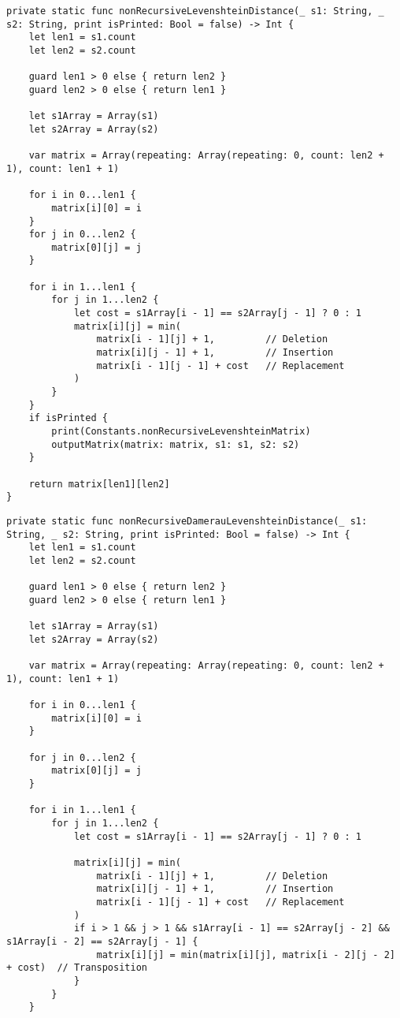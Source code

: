 \begin{lstlisting}[label=lst:nonRecursiveLevenshteinDistance,caption=Функция нахождения расстояния Левенштейна с использованием матрицы]
private static func nonRecursiveLevenshteinDistance(_ s1: String, _ s2: String, print isPrinted: Bool = false) -> Int {
	let len1 = s1.count
	let len2 = s2.count

	guard len1 > 0 else { return len2 }
	guard len2 > 0 else { return len1 }

	let s1Array = Array(s1)
	let s2Array = Array(s2)

	var matrix = Array(repeating: Array(repeating: 0, count: len2 + 1), count: len1 + 1)

	for i in 0...len1 {
		matrix[i][0] = i
	}
	for j in 0...len2 {
		matrix[0][j] = j
	}

	for i in 1...len1 {
		for j in 1...len2 {
			let cost = s1Array[i - 1] == s2Array[j - 1] ? 0 : 1
			matrix[i][j] = min(
				matrix[i - 1][j] + 1,         // Deletion
				matrix[i][j - 1] + 1,         // Insertion
				matrix[i - 1][j - 1] + cost   // Replacement
			)
		}
	}
	if isPrinted { 
		print(Constants.nonRecursiveLevenshteinMatrix)
		outputMatrix(matrix: matrix, s1: s1, s2: s2) 
	}

	return matrix[len1][len2]
}
\end{lstlisting}

\clearpage

\begin{lstlisting}[label=lst:nonRecursiveDamerauLevenshteinDistance,caption=Функция нахождения расстояния Дамерау~---~Левенштейна с использованием матрицы]
private static func nonRecursiveDamerauLevenshteinDistance(_ s1: String, _ s2: String, print isPrinted: Bool = false) -> Int {
	let len1 = s1.count
	let len2 = s2.count

	guard len1 > 0 else { return len2 }
	guard len2 > 0 else { return len1 }

	let s1Array = Array(s1)
	let s2Array = Array(s2)

	var matrix = Array(repeating: Array(repeating: 0, count: len2 + 1), count: len1 + 1)

	for i in 0...len1 {
		matrix[i][0] = i
	}

	for j in 0...len2 {
		matrix[0][j] = j
	}

	for i in 1...len1 {
		for j in 1...len2 {
			let cost = s1Array[i - 1] == s2Array[j - 1] ? 0 : 1

			matrix[i][j] = min(
				matrix[i - 1][j] + 1,         // Deletion
				matrix[i][j - 1] + 1,         // Insertion
				matrix[i - 1][j - 1] + cost   // Replacement
			)
			if i > 1 && j > 1 && s1Array[i - 1] == s2Array[j - 2] && s1Array[i - 2] == s2Array[j - 1] {
				matrix[i][j] = min(matrix[i][j], matrix[i - 2][j - 2] + cost)  // Transposition
			}
		}
	}
\end{lstlisting}

